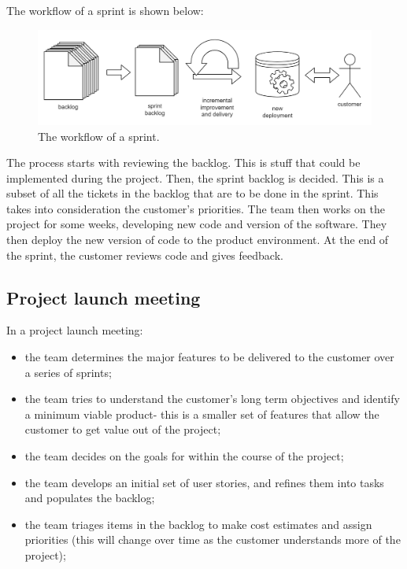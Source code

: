 \documentclass[a4paper, openany]{memoir}
\begin{document}
The workflow of a sprint is shown below:
\begin{figure}[H]
    \centering
    \includegraphics[scale=0.3]{src/2.1 SrcumWorkflow.png}
    \caption{The workflow of a sprint.}
\end{figure}
\noindent The process starts with reviewing the backlog. This is stuff that could be implemented during the project. Then, the sprint backlog is decided. This is a subset of all the tickets in the backlog that are to be done in the sprint. This takes into consideration the customer's priorities. The team then works on the project for some weeks, developing new code and version of the software. They then deploy the new version of code to the product environment. At the end of the sprint, the customer reviews code and gives feedback.

\subsection{Project launch meeting}
In a project launch meeting:
\begin{itemize}
    \item the team determines the major features to be delivered to the customer over a series of sprints;
    \item the team tries to understand the customer's long term objectives and identify a minimum viable product- this is a smaller set of features that allow the customer to get value out of the project;
    \item the team decides on the goals for within the course of the project;
    \item the team develops an initial set of user stories, and refines them into tasks and populates the backlog;
    \item the team triages items in the backlog to make cost estimates and assign priorities (this will change over time as the customer understands more of the project);
\end{itemize}
\end{document}
